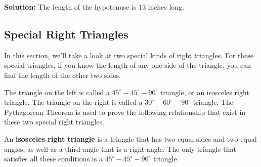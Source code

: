 \textbf{Solution:} The length of the hypotenuse is $13$ inches long.



\subsection{Special Right Triangles}
\label{sub_sec:special_right_triangles}

In this section, we'll take a look at two special kinds of right triangles. For
these special triangles, if you know the length of any one side of the
triangle, you can find the length of the other two sides.

\begin{figure}[htpb]
  \centering


  \label{fig:45_45_90_and_30_60_90_triangle}
\end{figure}

The triangle on the left is called a $45^{\circ}-45^{\circ}-90^{\circ}$
triangle, or an isosceles right triangle. The triangle on the right is called a
$30^{\circ}-60^{\circ}-90^{\circ}$ triangle. The Pythagorean Theorem is used to
prove the following relationship that exist in these two special right
triangles.

\begin{definition}
  \label{def:isosceles_right_triangle}

  An \textbf{isosceles right triangle} is a triangle that has two equal sides
  and two equal angles, as well as a third angle that is a right angle. The
  only triangle that satisfies all these conditions is a
  $45^{\circ}-45^{\circ}-90^{\circ}$ triangle.
\end{definition}

